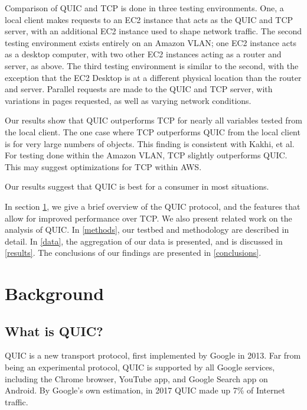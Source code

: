 \documentclass[12pt]{article}
\begin{document}
Comparison of QUIC and TCP is done in three testing environments. One, a local client makes requests to an EC2 instance that acts as the QUIC and TCP server, with an additional EC2 instance used to shape network traffic. The second testing environment exists entirely on an Amazon VLAN; one EC2 instance acts as a desktop computer, with two other EC2 instances acting as a router and server, as above. The third testing environment is similar to the second, with the exception that the EC2 Desktop is at a different physical location than the router and server. Parallel requests are made to the QUIC and TCP server, with variations in pages requested, as well as varying network conditions.

Our results show that QUIC outperforms TCP for nearly all variables tested from the local client. The one case where TCP outperforms QUIC from the local client is for very large numbers of objects. This finding is consistent with Kakhi, et al. For testing done within the Amazon VLAN, TCP slightly outperforms QUIC. This may suggest optimizations for TCP within AWS.

Our results suggest that QUIC is best for a consumer in most situations.

In section \ref{background}, we give a brief overview of the QUIC protocol, and the features that allow for improved performance over TCP. We also present related work on the analysis of QUIC. In \ref{methods}, our testbed and methodology are described in detail. In \ref{data}, the aggregation of our data is presented, and is discussed in \ref{results}. The conclusions of our findings are presented in \ref{conclusions}.

\section{Background}
\label{background}

\subsection{What is QUIC?}
\label{background:quic}

QUIC is a new transport protocol, first implemented by Google in 2013. Far from being an experimental protocol, QUIC is supported by all Google services, including the Chrome browser, YouTube app, and Google Search app on Android\cite{Langley:2017:QTP:3098822.3098842}. By Google's own estimation, in 2017 QUIC made up 7\% of Internet traffic\cite{Langley:2017:QTP:3098822.3098842}.
\end{document}
